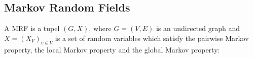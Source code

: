






\subsection{Markov Random Fields}\label{subsec:markov-random-fields}

A \Gls{MRF} is a tupel $(G, X)$, where $G=(V,E)$ is an undirected graph and
$X=(X_V)_{v \in V}$ is a set of random variables which satisfy the pairwise
Markov property, the local Markov property and the global Markov property:



